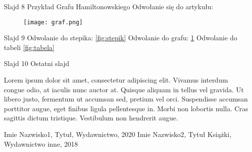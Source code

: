 \documentclass{beamer}
\begin{document}
\begin{frame}{Slajd 8}
Przykład Grafu Hamiltonowskiego
Odwołanie się do artykułu: \cite{Autor1}

\begin{figure}
    \centering
    \texttt{[image: graf.png]}
    \label{fig:graf}
\end{figure}
\end{frame}

\begin{frame}{Slajd 9}
Odwolanie do stepika: \ref{fig:stepik}
Odwolanie do grafu: \ref{fig:graf}
Odwolanie do tabeli \ref{fig:tabela}


\end{frame}


\begin{frame}{Slajd 10}
Ostatni slajd

\vspace{10pt}


Lorem ipsum dolor sit amet, consectetur adipiscing elit. Vivamus interdum congue odio, at iaculis nunc auctor at. Quisque aliquam in tellus vel gravida. Ut libero justo, fermentum ut accumsan sed, pretium vel orci. Suspendisse accumsan porttitor augue, eget finibus ligula pellentesque in. Morbi non lobortis nulla. Cras sagittis dictum tristique. Vestibulum non hendrerit augue. 

\end{frame}

\begin{frame}

  \begin{thebibliography}{99}
     Imie Nazwisko1, Tytuł, Wydawnictwo, 2020
     Imie Nazwisko2, Tytuł Książki, Wydawnictwo inne, 2018
  \end{thebibliography}

\end{frame}
\end{document}
